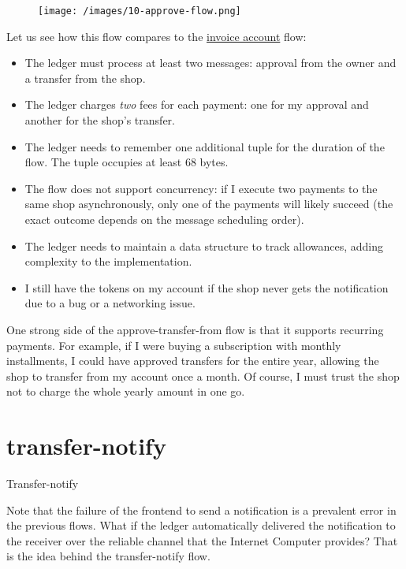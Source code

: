 \documentclass{article}
\begin{document}
\begin{figure}[grayscale-diagram]
\texttt{[image: /images/10-approve-flow.png]}
\end{figure}

Let us see how this flow compares to the \href{#invoice-account}{invoice account} flow:
\begin{itemize}
  \item The ledger must process at least two messages: approval from the owner and a transfer from the shop.
  \item The ledger charges \emph{two} fees for each payment: one for my approval and another for the shop's transfer.
  \item
    The ledger needs to remember one additional  tuple for the duration of the flow.
    The tuple occupies at least 68 bytes.
  \item
    The flow does not support concurrency: if I execute two payments to the same shop asynchronously, only one of the payments will likely succeed (the exact outcome depends on the message scheduling order).
  \item
    The ledger needs to maintain a data structure to track allowances, adding complexity to the implementation.
  \item
    I still have the tokens on my account if the shop never gets the notification due to a bug or a networking issue.
\end{itemize}

One strong side of the approve-transfer-from flow is that it supports recurring payments.
For example, if I were buying a subscription with monthly installments, I could have approved transfers for the entire year, allowing the shop to transfer from my account once a month.
Of course, I must trust the shop not to charge the whole yearly amount in one go.

\section{transfer-notify}{Transfer-notify}

Note that the failure of the frontend to send a notification is a prevalent error in the previous flows.
What if the ledger automatically delivered the notification to the receiver over the reliable channel that the Internet Computer provides?
That is the idea behind the transfer-notify flow.
\end{document}
